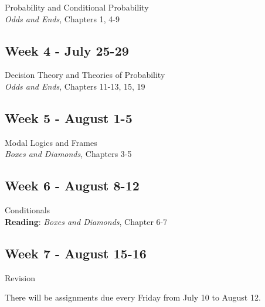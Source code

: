 \documentclass[10pt]{article}
\begin{document}
Probability and Conditional Probability\\
\textit{Odds and Ends}, Chapters 1, 4-9
 
\subsection*{Week 4 - July 25-29}

Decision Theory and Theories of Probability\\
\textit{Odds and Ends}, Chapters 11-13, 15, 19

\subsection*{Week 5 - August 1-5}

Modal Logics and Frames \\
\textit{Boxes and Diamonds}, Chapters 3-5

\subsection*{Week 6 - August 8-12}

Conditionals \\
\textbf{Reading}: \textit{Boxes and Diamonds}, Chapter 6-7

\subsection*{Week 7 - August 15-16}

Revision

\bigskip

There will be assignments due every Friday from July 10 to August 12.
\end{document}
